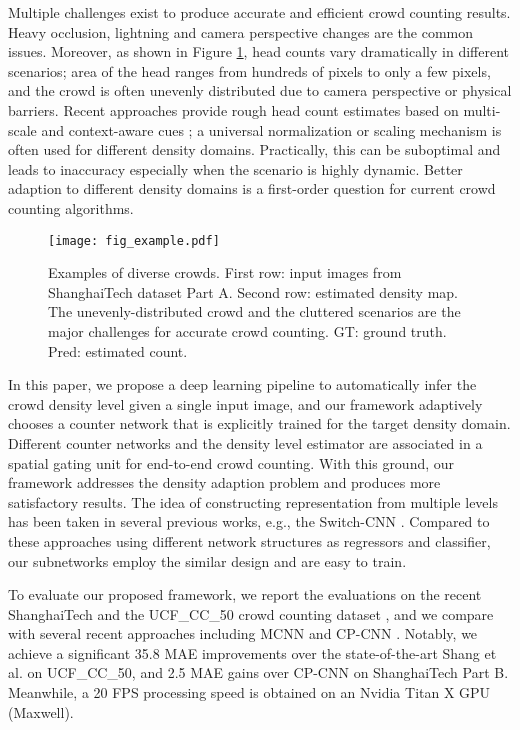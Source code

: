 \documentclass[journal]{IEEEtran}
\begin{document}
Multiple challenges exist to produce accurate and efficient crowd counting results.
Heavy occlusion, lightning and camera perspective changes are the common issues. Moreover, as shown in Figure \ref{fig:introductiongt}, head counts vary dramatically in different scenarios; area of the head ranges from hundreds of pixels to only a few pixels, and the crowd is often unevenly distributed due to camera perspective or physical barriers. Recent approaches provide rough head count estimates based on multi-scale and context-aware cues \cite{Zhang:2015id,Zhang:2016fr,kumagai2017mixture,sam2017switching,Sindagi:2017vv,zhang2017fcn,Xiong:2017ug}; a universal normalization or scaling mechanism is often used for different density domains. Practically, this can be suboptimal and leads to inaccuracy especially when the scenario is highly dynamic. Better adaption to different density domains is a first-order question for current crowd counting algorithms.

\begin{figure}[t]
  \centering
  \texttt{[image: fig\_example.pdf]}
  \caption{Examples of diverse crowds. First row: input images from ShanghaiTech dataset Part A. Second row: estimated density map. The unevenly-distributed crowd and the cluttered scenarios are the major challenges for accurate crowd counting. GT: ground truth. Pred: estimated count.}
  \label{fig:introductiongt}
  \vspace{-0.15in}
\end{figure}

In this paper, we propose a deep learning pipeline to automatically infer the crowd density level given a single input image, and our framework adaptively chooses a counter network that is explicitly trained for the target density domain. Different counter networks and the density level estimator are associated in a spatial gating unit for end-to-end crowd counting. With this ground, our framework addresses the density adaption problem and produces more satisfactory results.
The idea of constructing representation from multiple levels has been taken in several previous works, e.g., the Switch-CNN \cite{sam2017switching}. Compared to these approaches using different network structures as regressors and classifier, our subnetworks employ the similar design and are easy to train.

To evaluate our proposed framework, we report the evaluations
on the recent ShanghaiTech \cite{Zhang:2016fr} and the UCF\_CC\_50 crowd counting dataset \cite{idrees2013multi}, and we compare with several recent approaches including MCNN \cite{Zhang:2016fr} and CP-CNN \cite{Sindagi:2017vv}. Notably, we
achieve a significant 35.8 MAE improvements over the state-of-the-art Shang et al. \cite{Shang:2016iq} on UCF\_CC\_50, and 2.5 MAE gains over CP-CNN \cite{Sindagi:2017vv} on ShanghaiTech Part B. Meanwhile, a 20 FPS processing speed is obtained on an Nvidia Titan X GPU (Maxwell).
\end{document}
